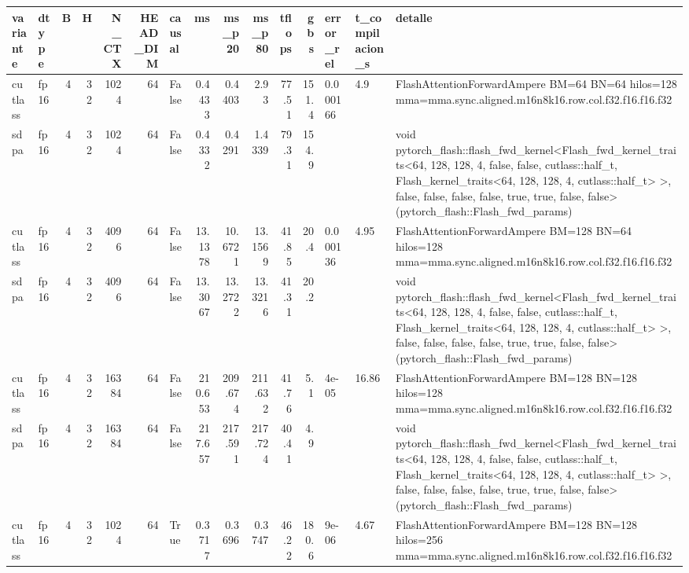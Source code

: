 \begin{table}[htbp]
  \centering\small
  \begin{tabular}{llrrrrlrrrrrlll}
    \toprule
    variante & dtype & B & H & N\_CTX & HEAD\_DIM & causal & ms & ms\_p20 & ms\_p80 & tflops & gbs & error\_rel & t\_compilacion\_s & detalle \\
    \midrule
    cutlass & fp16 & 4 & 32 & 1024 & 64 & False & 0.4433 & 0.4403 & 2.93 & 77.51 & 151.4 & 0.000166 & 4.9 & FlashAttentionForwardAmpere BM=64 BN=64 hilos=128 mma=mma.sync.aligned.m16n8k16.row.col.f32.f16.f16.f32 \\
    sdpa & fp16 & 4 & 32 & 1024 & 64 & False & 0.4332 & 0.4291 & 1.4339 & 79.31 & 154.9 &  &  & void pytorch\_flash::flash\_fwd\_kernel<Flash\_fwd\_kernel\_traits<64, 128, 128, 4, false, false, cutlass::half\_t, Flash\_kernel\_traits<64, 128, 128, 4, cutlass::half\_t> >, false, false, false, false, true, true, false, false>(pytorch\_flash::Flash\_fwd\_params) \\
    cutlass & fp16 & 4 & 32 & 4096 & 64 & False & 13.1378 & 10.6721 & 13.1569 & 41.85 & 20.4 & 0.000136 & 4.95 & FlashAttentionForwardAmpere BM=128 BN=64 hilos=128 mma=mma.sync.aligned.m16n8k16.row.col.f32.f16.f16.f32 \\
    sdpa & fp16 & 4 & 32 & 4096 & 64 & False & 13.3067 & 13.2722 & 13.3216 & 41.31 & 20.2 &  &  & void pytorch\_flash::flash\_fwd\_kernel<Flash\_fwd\_kernel\_traits<64, 128, 128, 4, false, false, cutlass::half\_t, Flash\_kernel\_traits<64, 128, 128, 4, cutlass::half\_t> >, false, false, false, false, true, true, false, false>(pytorch\_flash::Flash\_fwd\_params) \\
    cutlass & fp16 & 4 & 32 & 16384 & 64 & False & 210.653 & 209.674 & 211.632 & 41.76 & 5.1 & 4e-05 & 16.86 & FlashAttentionForwardAmpere BM=128 BN=128 hilos=128 mma=mma.sync.aligned.m16n8k16.row.col.f32.f16.f16.f32 \\
    sdpa & fp16 & 4 & 32 & 16384 & 64 & False & 217.657 & 217.591 & 217.724 & 40.41 & 4.9 &  &  & void pytorch\_flash::flash\_fwd\_kernel<Flash\_fwd\_kernel\_traits<64, 128, 128, 4, false, false, cutlass::half\_t, Flash\_kernel\_traits<64, 128, 128, 4, cutlass::half\_t> >, false, false, false, false, true, true, false, false>(pytorch\_flash::Flash\_fwd\_params) \\
    cutlass & fp16 & 4 & 32 & 1024 & 64 & True & 0.3717 & 0.3696 & 0.3747 & 46.22 & 180.6 & 9e-06 & 4.67 & FlashAttentionForwardAmpere BM=128 BN=128 hilos=256 mma=mma.sync.aligned.m16n8k16.row.col.f32.f16.f16.f32 \\

\end{tabular}
\end{table}

